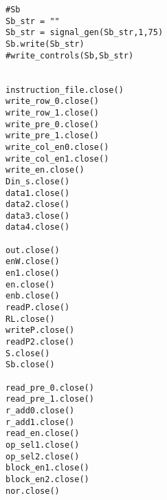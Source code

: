 \begin{lstlisting}
#Sb
Sb_str = ""
Sb_str = signal_gen(Sb_str,1,75)
Sb.write(Sb_str)
#write_controls(Sb,Sb_str)


instruction_file.close()
write_row_0.close()
write_row_1.close()
write_pre_0.close()
write_pre_1.close()
write_col_en0.close()
write_col_en1.close()
write_en.close()
Din_s.close()
data1.close()
data2.close()
data3.close()
data4.close()

out.close()
enW.close()    
en1.close()    
en.close()	  
enb.close()	  
readP.close()	  
RL.close() 
writeP.close() 
readP2.close()	  
S.close()
Sb.close()

read_pre_0.close()
read_pre_1.close()
r_add0.close()    
r_add1.close()    
read_en.close()	  
op_sel1.close()	  
op_sel2.close()	  
block_en1.close() 
block_en2.close() 
nor.close()	  


\end{lstlisting}